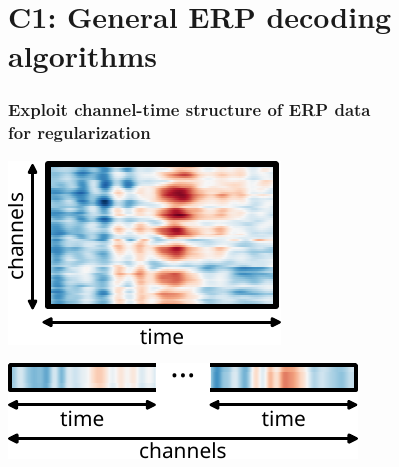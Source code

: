 \documentclass{kul-ulille-beamer}
\begin{document}
\tocframeall
\section{\textbf{C1}: General ERP decoding algorithms}
\tocframe

\begin{frame}[c]
  \frametitle{Exploit channel-time structure of ERP data \\ for regularization}
  \begin{minipage}[c]{.4\textwidth}
    \centering
    \includegraphics[width=\textwidth]{figures/bttda/tensor_st.pdf}
  \end{minipage}\hfill%
  \begin{minipage}[c]{.4\textwidth}
    \centering
    \includegraphics[width=\textwidth]{figures/bttda/tensor_flat.pdf}
  \end{minipage}
\end{frame}
\end{document}
